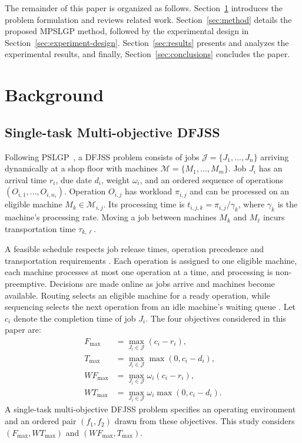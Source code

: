 \documentclass[10pt,journal]{IEEEtran}
\begin{document}
The remainder of this paper is organized as follows. Section~\ref{sec:background} introduces the problem formulation and reviews related work. Section~\ref{sec:method} details the proposed MPSLGP method, followed by the experimental design in Section~\ref{sec:experiment-design}. Section~\ref{sec:results} presents and analyzes the experimental results, and finally, Section~\ref{sec:conclusions} concludes the paper.

\section{Background}
\label{sec:background}
\subsection{Single-task Multi-objective DFJSS}
Following PSLGP~\cite{xu2026pslgp}, a DFJSS problem consists of jobs $\mathcal{J}=\{J_1,\ldots,J_n\}$ arriving dynamically at a shop floor with machines $\mathcal{M}=\{M_1,\ldots,M_m\}$. Job $J_i$ has an arrival time $r_i$, due date $d_i$, weight $\omega_i$, and an ordered sequence of operations $(O_{i,1},\ldots,O_{i,n_i})$. Operation $O_{i,j}$ has workload $\pi_{i,j}$ and can be processed on an eligible machine $M_k\in\mathcal{M}_{i,j}$. Its processing time is $t_{i,j,k}=\pi_{i,j}/\gamma_k$, where $\gamma_k$ is the machine's processing rate. Moving a job between machines $M_k$ and $M_\ell$ incurs transportation time $\tau_{k,\ell}$. 

A feasible schedule respects job release times, operation precedence and transportation requirements \cite{yi2025dynamic, chen2026reinforcement}. Each operation is assigned to one eligible machine, each machine processes at most one operation at a time, and processing is non-preemptive. Decisions are made online as jobs arrive and machines become available. Routing selects an eligible machine for a ready operation, while sequencing selects the next operation from an idle machine's waiting queue \cite{luo2025fully}. Let $c_i$ denote the completion time of job $J_i$. The four objectives considered in this paper are:
\begin{equation}
\begin{aligned}
F_{\max}  &= \max_{J_i\in\mathcal{J}}(c_i-r_i),\\
T_{\max}  &= \max_{J_i\in\mathcal{J}}\max(0,c_i-d_i),\\
WF_{\max} &= \max_{J_i\in\mathcal{J}}\omega_i(c_i-r_i),\\
WT_{\max} &= \max_{J_i\in\mathcal{J}}\omega_i\max(0,c_i-d_i).
\end{aligned}
\label{eq:dfjss-objectives}
\end{equation}
A single-task multi-objective DFJSS problem specifies an operating environment and an ordered pair $(f_1,f_2)$ drawn from these objectives. This study considers $(F_{\max},WT_{\max})$ and $(WF_{\max},T_{\max})$.
\end{document}

